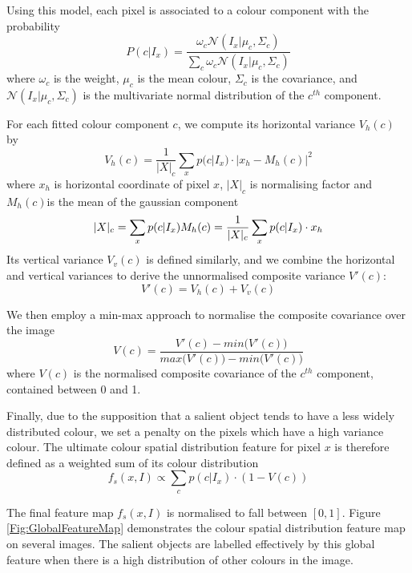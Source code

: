 \documentclass[10pt,twocolumn,letterpaper]{article}
\newcommand{\SUM}{\sum\limits}
\begin{document}
Using this model, each pixel is associated to a colour component with the probability $$P(c|I_x) = \frac{\omega_c\mathcal{N}(I_x|\mu_c,\Sigma_c)}{\SUM_c \omega_c \mathcal{N}(I_x|\mu_c,\Sigma_c)}$$where $\omega_c$ is the weight, $\mu_c$ is the mean colour, $\Sigma_c$ is the covariance, and $\mathcal N(I_x|\mu_c,\Sigma_c)$ is the multivariate normal distribution of the $c^{th}$ component. 

For each fitted colour component $c$, we compute its horizontal variance $V_{h}(c)$ by $$V_{h}(c) = \frac{1}{|X|_{c}} \sum_{x} p (c|I_{x}) \cdot | x_{h} - M_{h}(c) |^{2}$$where $x_h$ is horizontal coordinate of pixel $x$, $|X|_c$ is normalising factor and $M_h (c)$is the mean of the gaussian component$$|X|_c = \sum_x p(c|I_x)\\M_h (c) = \frac{1}{|X|_c} \sum_{x} p(c|I_x) \cdot x_h$$Its vertical variance $V_{v}(c)$ is defined similarly, and we combine the horizontal and vertical variances to derive the unnormalised composite variance $V'(c)$:$$V' (c) = V_h (c) + V_v (c) $$


We then employ a min-max approach to normalise the composite covariance over the image$$V (c) = \frac{V'(c) - min \big(V'(c)\big) }{max \big(V'(c)\big) - min \big(V'(c)\big)}$$where $V(c)$ is the normalised composite covariance of the $c^{th}$ component, contained between 0 and 1.

Finally, due to the supposition that a salient object tends to have a less widely distributed colour, we set a penalty on the pixels which have a high variance colour. The ultimate colour spatial distribution feature for pixel $x$ is therefore defined as a weighted sum of its colour distribution $$f_s(x,I)\propto\SUM_c p(c|I_x)\cdot(1-V(c))$$

The final feature map $f_s (x,I)$ is normalised to fall between $[0, 1]$. Figure \ref{Fig:GlobalFeatureMap} demonstrates the colour spatial distribution feature map on several images. The salient objects are labelled effectively by this global feature when there is a high distribution of other colours in the image.
\end{document}
